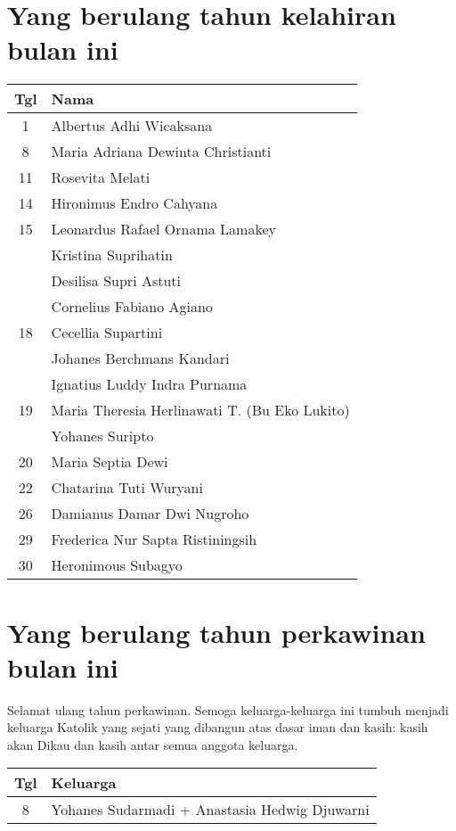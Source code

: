 

\section*{Yang berulang tahun kelahiran bulan ini}


\begin{longtable}{|c|l|} 
\hline
 Tgl & Nama \\ \hline
\endhead
 	1&	Albertus Adhi Wicaksana\\
 	8&	Maria Adriana Dewinta Christianti\\
 	11&	Rosevita Melati\\
 	14&	Hironimus Endro Cahyana\\
 	15&	Leonardus Rafael Ornama Lamakey\\
 	 &	Kristina Suprihatin\\
 	&	Desilisa Supri Astuti\\
 	&	Cornelius Fabiano Agiano\\
 	18&	Cecellia Supartini\\
 	&	Johanes Berchmans Kandari\\
 	&	Ignatius Luddy Indra Purnama\\
 	19&	Maria Theresia Herlinawati T. (Bu Eko Lukito)\\
 	&	Yohanes Suripto\\
	20&	Maria Septia Dewi\\
 	22&	Chatarina Tuti Wuryani\\
 	26&	Damianus Damar Dwi Nugroho\\
 	29&	Frederica Nur Sapta Ristiningsih\\
 	30&	Heronimous Subagyo\\ \hline
 \end{longtable}
 
\section*{Yang berulang tahun perkawinan  bulan ini}

Selamat ulang tahun perkawinan. Semoga keluarga-keluarga ini tumbuh menjadi keluarga Katolik yang sejati yang dibangun atas dasar iman dan kasih: kasih akan Dikau dan kasih antar semua anggota keluarga.

\begin{longtable}{|c|l|} 
\hline Tgl & Keluarga \\ \hline
8&Yohanes Sudarmadi + Anastasia Hedwig Djuwarni\\ \hline 
\end{longtable}

